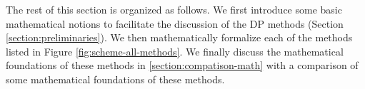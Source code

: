 
The rest of this section is organized as follows. 
We first introduce some basic mathematical notions to facilitate the discussion of the DP methods (Section \ref{section:preliminaries}).
We then mathematically formalize each of the methods listed in Figure \ref{fig:scheme-all-methods}.
We finally discuss the mathematical foundations of these methods in \ref{section:compatison-math} with a comparison of some mathematical foundations of these methods. 
